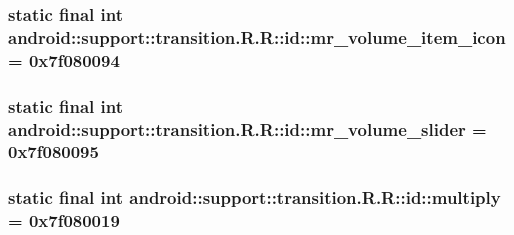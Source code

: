 \hypertarget{classandroid_1_1support_1_1transition_1_1_r_1_1id_2108bbbc1466374ba892842f56c5621d}{
\subsubsection[{mr\_\-volume\_\-item\_\-icon}]{\setlength{\rightskip}{0pt plus 5cm}static final int android::support::transition.R.R::id::mr\_\-volume\_\-item\_\-icon = 0x7f080094}}
\label{classandroid_1_1support_1_1transition_1_1_r_1_1id_2108bbbc1466374ba892842f56c5621d}


\hypertarget{classandroid_1_1support_1_1transition_1_1_r_1_1id_045bc86ed367d09cae4b25f4986e078a}{
\subsubsection[{mr\_\-volume\_\-slider}]{\setlength{\rightskip}{0pt plus 5cm}static final int android::support::transition.R.R::id::mr\_\-volume\_\-slider = 0x7f080095}}
\label{classandroid_1_1support_1_1transition_1_1_r_1_1id_045bc86ed367d09cae4b25f4986e078a}


\hypertarget{classandroid_1_1support_1_1transition_1_1_r_1_1id_9374a6af4e65ff76866eb1e68e8cfde3}{
\subsubsection[{multiply}]{\setlength{\rightskip}{0pt plus 5cm}static final int android::support::transition.R.R::id::multiply = 0x7f080019}}
\label{classandroid_1_1support_1_1transition_1_1_r_1_1id_9374a6af4e65ff76866eb1e68e8cfde3}



